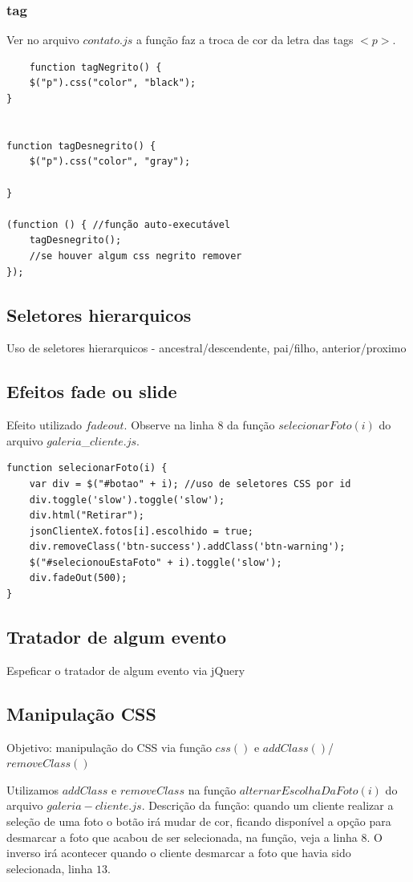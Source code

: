 \subsubsection{tag}
	Ver no arquivo $contato.js$ a função faz a troca de cor da letra das tags $<p>$.
\begin{lstlisting}
	function tagNegrito() {
    $("p").css("color", "black");
}


function tagDesnegrito() {
    $("p").css("color", "gray");

}

(function () { //função auto-executável
    tagDesnegrito();
    //se houver algum css negrito remover
});

\end{lstlisting}
\subsection{Seletores hierarquicos}
Uso de seletores hierarquicos - ancestral/descendente, pai/filho, anterior/proximo
\subsection{Efeitos fade ou slide}

	Efeito utilizado $fadeout$.
	Observe na linha $8$ da função $selecionarFoto(i)$ do arquivo $galeria$\_$cliente.js$.
	
\begin{lstlisting}	
function selecionarFoto(i) {
    var div = $("#botao" + i); //uso de seletores CSS por id
    div.toggle('slow').toggle('slow');
    div.html("Retirar");
    jsonClienteX.fotos[i].escolhido = true;
    div.removeClass('btn-success').addClass('btn-warning');
    $("#selecionouEstaFoto" + i).toggle('slow');
    div.fadeOut(500);
}
\end{lstlisting}

\subsection{Tratador de algum evento}
Espeficar o tratador de algum evento via jQuery
\subsection{Manipulação CSS}
	Objetivo: manipulação do CSS via função $css()$ e $addClass()$/$removeClass()$

	Utilizamos $addClass$ e $removeClass$ na função $alternarEscolhaDaFoto(i)$ do arquivo $galeria-cliente.js$. 
	Descrição da função: quando um cliente realizar a seleção de uma foto o botão irá mudar de cor, ficando disponível a opção para desmarcar a foto que acabou de ser selecionada, na função, veja a linha $8$. O inverso irá acontecer quando o cliente desmarcar a foto que havia sido selecionada, linha $13$.
	

